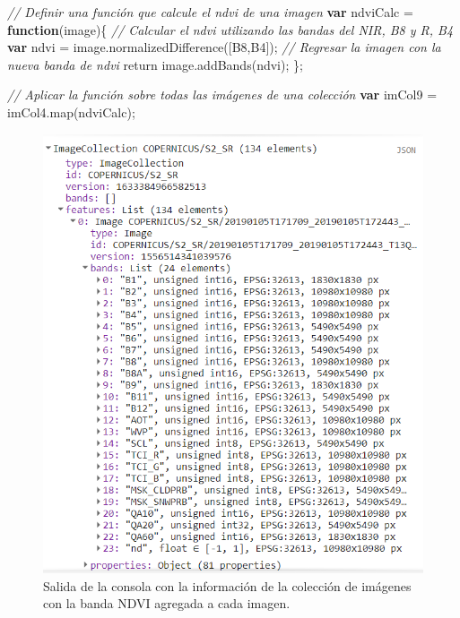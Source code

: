 \documentclass[
  12pt,
  letterpaper,
  twoside]{book}
\newenvironment{Shaded}{\begin{snugshade}}{\end{snugshade}}
\newcommand{\CommentTok}[1]{\textcolor[rgb]{0.24,0.58,0.00}{\textit{#1}}}
\newcommand{\ControlFlowTok}[1]{\textcolor[rgb]{0.00,0.00,0.00}{#1}}
\newcommand{\FunctionTok}[1]{\textcolor[rgb]{0.48,0.12,0.64}{#1}}
\newcommand{\KeywordTok}[1]{\textcolor[rgb]{0.00,0.00,0.00}{\textbf{#1}}}
\newcommand{\NormalTok}[1]{#1}
\newcommand{\OperatorTok}[1]{\textcolor[rgb]{0.00,0.00,0.00}{#1}}
\newcommand{\StringTok}[1]{\textcolor[rgb]{0.87,0.29,0.22}{#1}}
\begin{document}
\begin{Shaded}
\begin{Highlighting}[]
\CommentTok{// Definir una función que calcule el ndvi de una imagen}
\KeywordTok{var}\NormalTok{ ndviCalc }\OperatorTok{=} \KeywordTok{function}\NormalTok{(image)\{}
  \CommentTok{// Calcular el ndvi utilizando las bandas del NIR, B8 y R, B4}
  \KeywordTok{var}\NormalTok{ ndvi }\OperatorTok{=}\NormalTok{ image}\OperatorTok{.}\FunctionTok{normalizedDifference}\NormalTok{([}\StringTok{\textquotesingle{}B8\textquotesingle{}}\OperatorTok{,}\StringTok{\textquotesingle{}B4\textquotesingle{}}\NormalTok{])}\OperatorTok{;}
  \CommentTok{// Regresar la imagen con la nueva banda de ndvi}
  \ControlFlowTok{return}\NormalTok{ image}\OperatorTok{.}\FunctionTok{addBands}\NormalTok{(ndvi)}\OperatorTok{;}
\NormalTok{\}}\OperatorTok{;}

\CommentTok{// Aplicar la función sobre todas las imágenes de una colección}
\KeywordTok{var}\NormalTok{ imCol9 }\OperatorTok{=}\NormalTok{ imCol4}\OperatorTok{.}\FunctionTok{map}\NormalTok{(ndviCalc)}\OperatorTok{;}
\end{Highlighting}
\end{Shaded}

\begin{figure}[H]

{\centering \includegraphics[width=0.8\linewidth]{Img/imcol9} 

}

\caption{Salida de la consola con la información de la colección de imágenes con la banda NDVI agregada a cada imagen.}\label{fig:f1011}
\end{figure}
\end{document}
